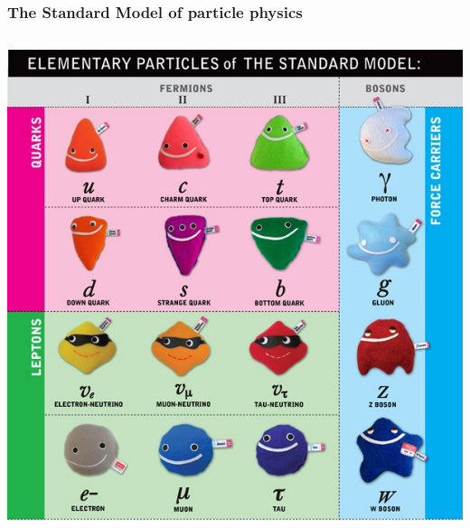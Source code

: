\documentclass[xcolor=dvipsnames]{beamer}
\begin{document}
\begin{frame}
\frametitle{The Standard Model of particle physics}

\begin{columns}
  \includegraphics[width=\linewidth]{SM}
  \centering
  \vspace{5mm}

\end{columns}
\end{frame}
\end{document}

